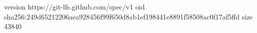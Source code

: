 version https://git-lfs.github.com/spec/v1
oid sha256:249d65212206aea928456f99f650d8ab1ef198441e8891f58508ac0f17af5ffd
size 43840
